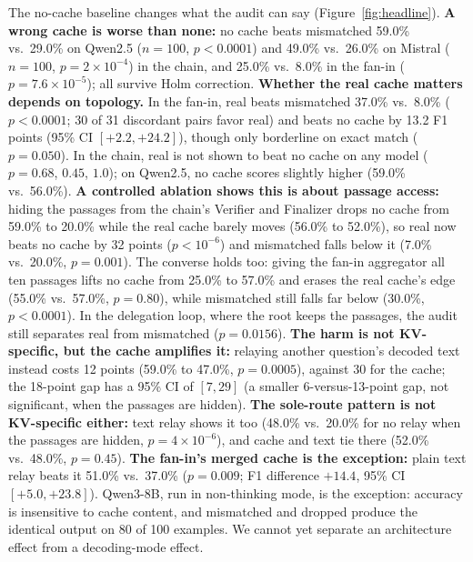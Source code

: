\documentclass[11pt]{article}
\begin{document}
The no-cache baseline changes what the audit can say (Figure~\ref{fig:headline}).
\textbf{A wrong cache is worse than none:} no cache beats mismatched 59.0\% vs.\
29.0\% on Qwen2.5 ($n{=}100$, $p<0.0001$) and 49.0\% vs.\ 26.0\% on Mistral
($n{=}100$, $p=2\times10^{-4}$) in the chain, and 25.0\% vs.\ 8.0\% in the fan-in
($p=7.6\times10^{-5}$); all survive Holm correction. \textbf{Whether the real cache
matters depends on topology.} In the fan-in, real beats mismatched 37.0\% vs.\ 8.0\%
($p<0.0001$; 30 of 31 discordant pairs favor real) and beats no cache by 13.2 F1
points (95\% CI $[+2.2,+24.2]$), though only borderline on exact match
($p=0.050$). In the chain, real is not shown to beat no cache on any model
($p=0.68$, $0.45$, $1.0$); on Qwen2.5, no cache scores slightly higher (59.0\% vs.\
56.0\%). \textbf{A controlled ablation shows this is about passage access:} hiding
the passages from the chain's Verifier and Finalizer drops no cache from 59.0\% to
20.0\% while the real cache barely moves (56.0\% to 52.0\%), so real now beats no
cache by 32 points ($p<10^{-6}$) and mismatched falls below it (7.0\% vs.\ 20.0\%,
$p=0.001$). The converse holds too: giving the fan-in aggregator all ten passages
lifts no cache from 25.0\% to 57.0\% and erases the real cache's edge (55.0\% vs.\
57.0\%, $p=0.80$), while mismatched still falls far below (30.0\%, $p<0.0001$). In
the delegation loop, where the root keeps the passages, the audit still separates
real from mismatched ($p=0.0156$). \textbf{The harm is not KV-specific, but the cache amplifies it:}
relaying another question's decoded text instead costs 12 points (59.0\% to
47.0\%, $p=0.0005$), against 30 for the cache; the 18-point gap has a 95\% CI of
$[7,29]$ (a smaller 6-versus-13-point gap, not significant, when the passages are
hidden). \textbf{The sole-route pattern is not KV-specific either:} text relay shows
it too (48.0\% vs.\ 20.0\% for no relay when the passages are hidden,
$p=4\times10^{-6}$), and cache and text tie there (52.0\% vs.\ 48.0\%, $p=0.45$).
\textbf{The fan-in's merged cache is the exception:} plain text relay beats it
51.0\% vs.\ 37.0\% ($p=0.009$; F1 difference $+14.4$, 95\% CI $[+5.0,+23.8]$).
Qwen3-8B, run in
non-thinking mode, is the exception: accuracy is insensitive to cache content, and
mismatched and dropped produce the identical output on 80 of 100 examples. We cannot
yet separate an architecture effect from a decoding-mode effect.
\end{document}
